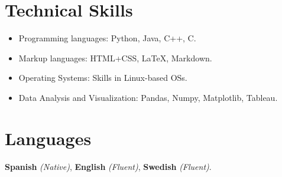 \documentclass[letterpaper,10pt]{article}
\begin{document}
\section{Technical Skills}
\begin{itemize}[leftmargin=*]
  \item Programming languages: Python, Java, C++, C.
  \vspace{-5pt}\item Markup languages: HTML+CSS, \LaTeX, Markdown.
  \vspace{-5pt}\item Operating Systems: Skills in Linux-based OSs.
  \vspace{-5pt}\item Data Analysis and Visualization: Pandas, Numpy, Matplotlib, Tableau.
\end{itemize}

\section{Languages}
\textbf{Spanish} \emph{(Native)}, \textbf{English} \emph{(Fluent)}, \textbf{Swedish} \emph{(Fluent)}.



\end{document}
